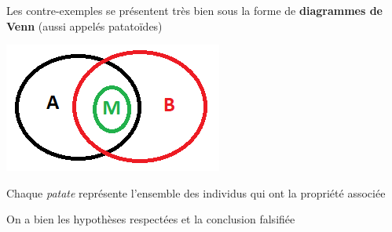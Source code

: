 \begin{frame}
	
	\begin{description}[labelindent=6pt,style=multiline,leftmargin=1.3in]
		 \setlength\itemsep{1em}
		 
\item[Par contre] Les contre-exemples se présentent très bien sous la forme de \textbf{diagrammes de Venn} (aussi appelés patatoïdes)\pause
\item[Exemple] 	\includegraphics[scale=0.5]{1256.png}\pause
\item[] Chaque \textit{patate} représente l'ensemble des individus qui ont la propriété associée\pause
\item On a bien les hypothèses respectées et la conclusion falsifiée
	\end{description} 

	
\end{frame}







%
%	
% 
%


